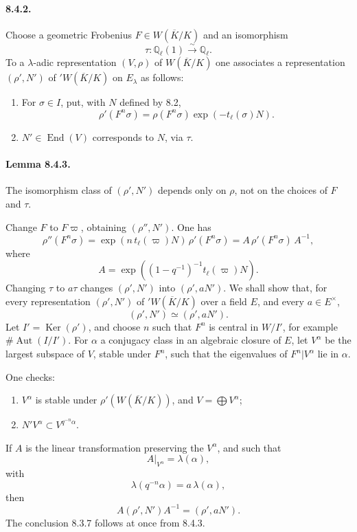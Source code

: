 \documentclass[10pt]{article}
\newcommand{\iso}{\xrightarrow{\sim}}
\providecommand{\Ker}{\operatorname{Ker}}
\providecommand{\Aut}{\operatorname{Aut}}
\providecommand{\End}{\operatorname{End}}
\providecommand{\End}{\operatorname{End}}
\providecommand{\Ker}{\operatorname{Ker}}
\begin{document}
\paragraph{8.4.2.} Choose a geometric Frobenius \(F\in W(\overline K/K)\) and an isomorphism
\[
\tau:\mathbb Q_\ell(1)\iso\mathbb Q_\ell.
\]
To a \(\lambda\)-adic representation \((V,\rho)\) of \(W(\overline K/K)\) one associates a representation \((\rho',N')\) of \({}'W(\overline K/K)\) on \(E_\lambda\) as follows:
\begin{enumerate}[label=(\alph*)]
\item For \(\sigma\in I\), put, with \(N\) defined by 8.2,
\[
\rho'(F^n\sigma)=\rho(F^n\sigma)\exp(-t_\ell(\sigma)N).
\]
\item \(N'\in\End(V)\) corresponds to \(N\), via \(\tau\).
\end{enumerate}

\paragraph{Lemma 8.4.3.} The isomorphism class of \((\rho',N')\) depends only on \(\rho\), not on the choices of \(F\) and \(\tau\).

Change \(F\) to \(F\varpi\), obtaining \((\rho'',N')\). One has
\[
\rho''(F^n\sigma)=
\exp(n\,t_\ell(\varpi)N)\,\rho'(F^n\sigma)
=
A\,\rho'(F^n\sigma)\,A^{-1},
\]
where
\[
A=\exp((1-q^{-1})^{-1}t_\ell(\varpi)N).
\]
Changing \(\tau\) to \(a\tau\) changes \((\rho',N')\) into \((\rho',aN')\). We shall show that, for every representation \((\rho',N')\) of \({}'W(\overline K/K)\) over a field \(E\), and every \(a\in E^\times\),
\[
(\rho',N')\simeq(\rho',aN').
\]
Let \(I'=\Ker(\rho')\), and choose \(n\) such that \(F^n\) is central in \(W/I'\), for example \(\#\Aut(I/I')\). For \(\alpha\) a conjugacy class in an algebraic closure of \(E\), let \(V^\alpha\) be the largest subspace of \(V\), stable under \(F^n\), such that the eigenvalues of \(F^n|V^\alpha\) lie in \(\alpha\).

One checks:
\begin{enumerate}[label=(\alph*)]
\item \(V^\alpha\) is stable under \(\rho'(W(\overline K/K))\), and \(V=\bigoplus V^\alpha\);
\item \(N' V^\alpha\subset V^{q^{-n}\alpha}\).
\end{enumerate}
If \(A\) is the linear transformation preserving the \(V^\alpha\), and such that
\[
A|_{V^\alpha}=\lambda(\alpha),
\]
with
\[
\lambda(q^{-n}\alpha)=a\,\lambda(\alpha),
\]
then
\[
A(\rho',N')A^{-1}=(\rho',aN').
\]
The conclusion 8.3.7 follows at once from 8.4.3.
\end{document}
